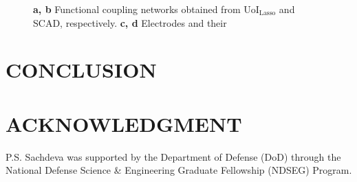 \documentclass[letterpaper, 10 pt, conference]{ieeeconf}  %
\begin{document}
\begin{figure}[b]
    \centering
    \caption{\textbf{a, b} Functional coupling networks obtained from UoI$_{\text{Lasso}}$ and SCAD, respectively. \textbf{c, d} Electrodes and their }
    \label{fig:vsmc}
\end{figure}
\section{CONCLUSION}


\addtolength{\textheight}{-12cm}   %








\section*{ACKNOWLEDGMENT}

P.S. Sachdeva was supported by the Department of Defense (DoD) through the National Defense Science \& Engineering Graduate Fellowship (NDSEG) Program.


\end{document}
